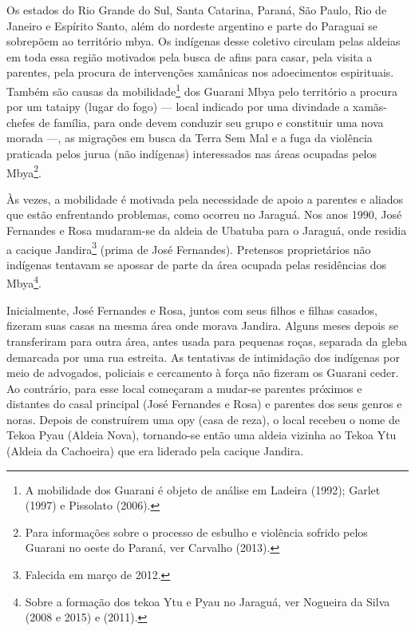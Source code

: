 Os estados do Rio Grande do Sul, Santa Catarina, Paraná, São Paulo, Rio
de Janeiro e Espírito Santo, além do nordeste argentino e parte do
Paraguai se sobrepõem ao território mbya. Os indígenas desse coletivo
circulam pelas aldeias em toda essa região motivados pela busca de
afins para casar, pela visita a parentes, pela procura de intervenções
xamânicas nos adoecimentos espirituais. Também são causas da
mobilidade\footnote{A mobilidade dos Guarani é objeto de análise em
Ladeira (1992); Garlet (1997) e Pissolato (2006).} dos Guarani Mbya
pelo território a procura por um tataipy (lugar do fogo) — local
indicado por uma divindade a xamãs-chefes de família, para onde devem
conduzir seu grupo e constituir uma nova morada —, as migrações em
busca da Terra Sem Mal e a fuga da violência praticada pelos jurua (não
indígenas) interessados nas áreas ocupadas pelos Mbya\footnote{Para
informações sobre o processo de esbulho e violência sofrido pelos
Guarani no oeste do Paraná, ver Carvalho (2013).}.

Às vezes, a mobilidade é motivada pela necessidade de apoio a parentes e
aliados que estão enfrentando problemas, como ocorreu no Jaraguá. Nos
anos 1990, José Fernandes e Rosa mudaram-se da aldeia de Ubatuba para o
Jaraguá, onde residia a cacique Jandira\footnote{Falecida em março de
2012.} (prima de José Fernandes). Pretensos proprietários não indígenas
tentavam se apossar de parte da área ocupada pelas residências dos
Mbya\footnote{Sobre a formação dos tekoa Ytu e Pyau no Jaraguá, ver
Nogueira da Silva (2008 e 2015) e  (2011).}. 

Inicialmente, José Fernandes e Rosa, juntos com seus filhos e filhas
casados, fizeram suas casas na mesma área onde morava Jandira. Alguns
meses depois se transferiram para outra área, antes usada para pequenas
roças, separada da gleba demarcada por uma rua estreita. As tentativas
de intimidação dos indígenas por meio de advogados, policiais e
cercamento à força não fizeram os Guarani ceder. Ao contrário, para
esse local começaram a mudar-se parentes próximos e distantes do casal
principal (José Fernandes e Rosa) e parentes dos seus genros e noras.
Depois de construírem uma opy (casa de reza), o local recebeu o nome de
Tekoa Pyau (Aldeia Nova), tornando-se então uma aldeia vizinha ao Tekoa
Ytu (Aldeia da Cachoeira) que era liderado pela cacique Jandira.

